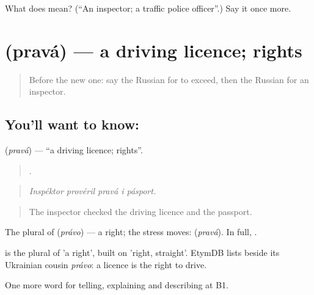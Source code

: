 \begin{tcolorbox}[breakable,colback=teal!4,colframe=teal!35!black,title={Before you move on}]
What does  mean? (\textquotedblleft{}An inspector; a traffic police officer\textquotedblright{}.) Say it once more.
\end{tcolorbox}
\section[\texorpdfstring{\ru{права} (pravá)}{права (pravá)}]{ (pravá) — a driving licence; rights}

\label{lesson:RU-C408-prava}



\begin{quote}
Before the new one: say the Russian for to exceed, then the Russian for an inspector.
\end{quote}

\subsection*{You'll want to know: }
\textbf{} (\emph{pravá}) — \textquotedblleft{}a driving licence; rights\textquotedblright{}.

\begin{quote}
    .
\end{quote}

\begin{quote}
\emph{Inspéktor provéril pravá i pásport.}
\end{quote}

\begin{quote}
The inspector checked the driving licence and the passport.
\end{quote}

The plural of \emph{} (\emph{právo}) — a right; the stress moves: \emph{} (\emph{pravá}). In full, \emph{ }.

\begin{cousinweb}
\emph{} is the plural of \emph{} 'a right', built on \emph{} 'right, straight'. EtymDB lists \emph{} beside its Ukrainian cousin \emph{právo}: a licence is the right to drive.
\end{cousinweb}

\begin{grammarlens}[title={What you've built}]
One more word for telling, explaining and describing at B1.
\end{grammarlens}

